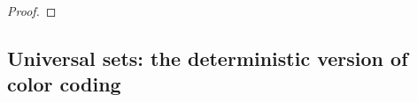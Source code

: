 \begin{proof}
%
%
\end{proof}
	
		


\subsection{Universal sets: the deterministic version of color coding} \label{sec:color:coding}

